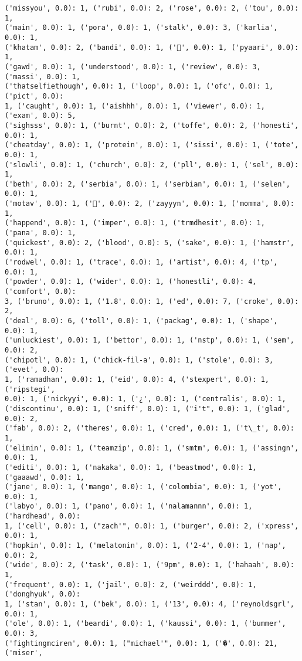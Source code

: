 \documentclass[11pt]{article}
\begin{document}
\begin{Verbatim}[commandchars=\\\{\}]
('missyou', 0.0): 1, ('rubi', 0.0): 2, ('rose', 0.0): 2, ('tou', 0.0): 1,
('main', 0.0): 1, ('pora', 0.0): 1, ('stalk', 0.0): 3, ('karlia', 0.0): 1,
('khatam', 0.0): 2, ('bandi', 0.0): 1, ('👑', 0.0): 1, ('pyaari', 0.0): 1,
('gawd', 0.0): 1, ('understood', 0.0): 1, ('review', 0.0): 3, ('massi', 0.0): 1,
('thatselfiethough', 0.0): 1, ('loop', 0.0): 1, ('ofc', 0.0): 1, ('pict', 0.0):
1, ('caught', 0.0): 1, ('aishhh', 0.0): 1, ('viewer', 0.0): 1, ('exam', 0.0): 5,
('sighsss', 0.0): 1, ('burnt', 0.0): 2, ('toffe', 0.0): 2, ('honesti', 0.0): 1,
('cheatday', 0.0): 1, ('protein', 0.0): 1, ('sissi', 0.0): 1, ('tote', 0.0): 1,
('slowli', 0.0): 1, ('church', 0.0): 2, ('pll', 0.0): 1, ('sel', 0.0): 1,
('beth', 0.0): 2, ('serbia', 0.0): 1, ('serbian', 0.0): 1, ('selen', 0.0): 1,
('motav', 0.0): 1, ('💋', 0.0): 2, ('zayyyn', 0.0): 1, ('momma', 0.0): 1,
('happend', 0.0): 1, ('imper', 0.0): 1, ('trmdhesit', 0.0): 1, ('pana', 0.0): 1,
('quickest', 0.0): 2, ('blood', 0.0): 5, ('sake', 0.0): 1, ('hamstr', 0.0): 1,
('rodwel', 0.0): 1, ('trace', 0.0): 1, ('artist', 0.0): 4, ('tp', 0.0): 1,
('powder', 0.0): 1, ('wider', 0.0): 1, ('honestli', 0.0): 4, ('comfort', 0.0):
3, ('bruno', 0.0): 1, ('1.8', 0.0): 1, ('ed', 0.0): 7, ('croke', 0.0): 2,
('deal', 0.0): 6, ('toll', 0.0): 1, ('packag', 0.0): 1, ('shape', 0.0): 1,
('unluckiest', 0.0): 1, ('bettor', 0.0): 1, ('nstp', 0.0): 1, ('sem', 0.0): 2,
('chipotl', 0.0): 1, ('chick-fil-a', 0.0): 1, ('stole', 0.0): 3, ('evet', 0.0):
1, ('ramadhan', 0.0): 1, ('eid', 0.0): 4, ('stexpert', 0.0): 1, ('ripstegi',
0.0): 1, ('nickyyi', 0.0): 1, ('¿', 0.0): 1, ('centralis', 0.0): 1,
('discontinu', 0.0): 1, ('sniff', 0.0): 1, ("i't", 0.0): 1, ('glad', 0.0): 2,
('fab', 0.0): 2, ('theres', 0.0): 1, ('cred', 0.0): 1, ('t\_t', 0.0): 1,
('elimin', 0.0): 1, ('teamzip', 0.0): 1, ('smtm', 0.0): 1, ('assingn', 0.0): 1,
('editi', 0.0): 1, ('nakaka', 0.0): 1, ('beastmod', 0.0): 1, ('gaaawd', 0.0): 1,
('jane', 0.0): 1, ('mango', 0.0): 1, ('colombia', 0.0): 1, ('yot', 0.0): 1,
('labyo', 0.0): 1, ('pano', 0.0): 1, ('nalamannn', 0.0): 1, ('hardhead', 0.0):
1, ('cell', 0.0): 1, ("zach'", 0.0): 1, ('burger', 0.0): 2, ('xpress', 0.0): 1,
('hopkin', 0.0): 1, ('melatonin', 0.0): 1, ('2-4', 0.0): 1, ('nap', 0.0): 2,
('wide', 0.0): 2, ('task', 0.0): 1, ('9pm', 0.0): 1, ('hahaah', 0.0): 1,
('frequent', 0.0): 1, ('jail', 0.0): 2, ('weirddd', 0.0): 1, ('donghyuk', 0.0):
1, ('stan', 0.0): 1, ('bek', 0.0): 1, ('13', 0.0): 4, ('reynoldsgrl', 0.0): 1,
('ole', 0.0): 1, ('beardi', 0.0): 1, ('kaussi', 0.0): 1, ('bummer', 0.0): 3,
('fightingmciren', 0.0): 1, ("michael'", 0.0): 1, ('�', 0.0): 21, ('miser',

\end{Verbatim}
\end{document}
